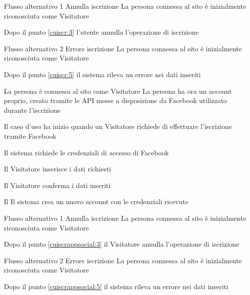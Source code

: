 %
{Flusso alternativo 1}%
{Annulla iscrizione}%
{La persona connessa al sito è inizialmente riconosciuta come Visitatore}%
{\postNulle}%
{\begin{enumCU}
		\item Dopo il punto \ref{cuiscr:3} l'utente annulla l'operazione di iscrizione
	\end{enumCU}}%
%
{Flusso alternativo 2}%
{Errore iscrizione}%
{La persona connessa al sito è inizialmente riconosciuta come Visitatore}%
{\postNulle}%
{\begin{enumCU}
		\item Dopo il punto \ref{cuiscr:5} il sistema rileva un errore nei dati inseriti
	\end{enumCU}}%



{}
{La persona è connessa al sito come Visitatore}
{La persona ha ora un account proprio, creato tramite le API messe a disposizione da Facebook utilizzato durante l'iscrizione}
{\begin{enumCU}
		\item Il caso d'uso ha inizio quando un Visitatore richiede di effettuare l'iscrizione tramite Facebook
		\item Il sistema richiede le credenziali di accesso di Facebook
		\item Il Visitatore inserisce i dati richiesti \label{cuiscrappsocial:3}
		\item Il Visitatore conferma i dati inseriti \label{cuiscrappsocial:5}
		\item Il Il sistema crea un nuovo account con le credenziali ricevute
	\end{enumCU}}

%
{Flusso alternativo 1}%
{Annulla iscrizione}%
{La persona connessa al sito è inizialmente riconosciuta come Visitatore}%
{\postNulle}%
{\begin{enumCU}
		\item Dopo il punto \ref{cuiscrappsocial:3} il Visitatore annulla l'operazione di iscrizione
	\end{enumCU}}%
%
{Flusso alternativo 2}%
{Errore iscrizione}%
{La persona connessa al sito è inizialmente riconosciuta come Visitatore}%
{\postNulle}%
{\begin{enumCU}
		\item Dopo il punto \ref{cuiscrappsocial:5} il sistema rileva un errore nei dati inseriti
	\end{enumCU}}%

